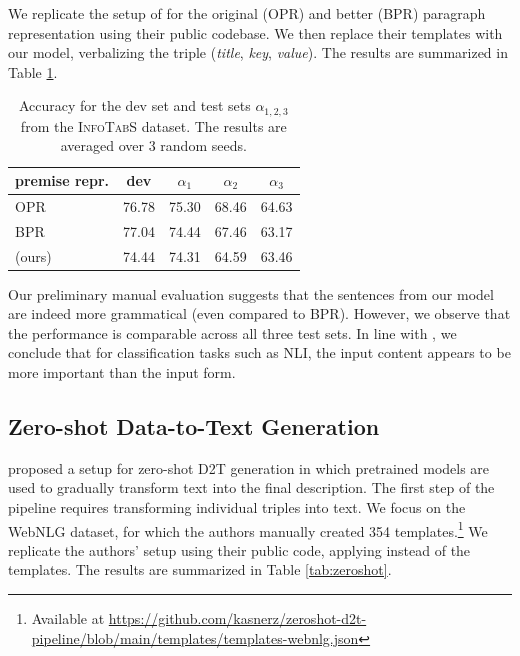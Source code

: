 We replicate the setup of \citet{neeraja2021incorporating} for the original (OPR) and better (BPR) paragraph representation using their public codebase. We then replace their templates with our \BARTr{} model, verbalizing the triple (\textit{title}, \textit{key}, \textit{value}). The results are summarized in Table \ref{tab:nli}.

\begin{table}[t]\centering
    \small
    \setlength{\tabcolsep}{4pt}
    \begin{tabular}{lcccc}\toprule
        premise repr.                       & dev   & $\alpha_1$ & $\alpha_2$ & $\alpha_3$ \\\midrule
        OPR \cite{gupta2020infotabs}        & 76.78 & 75.30      & 68.46      & 64.63      \\
        BPR \cite{neeraja2021incorporating} & 77.04 & 74.44      & 67.46      & 63.17      \\
        \BARTr{} (ours)                     & 74.44 & 74.31      & 64.59      & 63.46      \\
        \bottomrule
    \end{tabular}
    \caption{Accuracy for the dev set and test sets  $\alpha_{1,2,3}$ from the \textsc{InfoTabS} dataset. The results are averaged over 3 random seeds.}\label{tab:nli}
\end{table}

Our preliminary manual evaluation suggests that the sentences from our model are indeed more grammatical (even compared to BPR). However, we observe that the
performance is comparable across all three test sets. In line with \citet{mccoy2019right}, we conclude that for classification tasks such as NLI, the input content appears to be more important than the input form.

\subsection{Zero-shot Data-to-Text Generation}
\label{sec:zeroshot}

\citet{kasner2022neural} proposed a setup for zero-shot D2T generation in which pretrained models are used to gradually transform text into the final description. The first step of the pipeline requires transforming individual triples into text. We focus on the WebNLG dataset, for which the authors manually created 354 templates.\footnote{Available at \url{https://github.com/kasnerz/zeroshot-d2t-pipeline/blob/main/templates/templates-webnlg.json}} We replicate the authors' setup using their public code, applying \BARTr{} instead of the templates.
The results are summarized in Table \ref{tab:zeroshot}.

